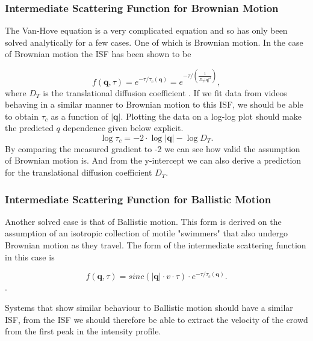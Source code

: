\documentclass[10pt]{article}
\begin{document}
\subsubsection{Intermediate Scattering Function for Brownian Motion}
The Van-Hove equation is a very complicated equation and so has only been solved analytically for a few cases. One of which is Brownian motion. In the case of Brownian motion the ISF has been shown to be

\begin{equation}
\label{eqn:BrownianISF}
	f(\textbf{q}, \tau) = e^{- \tau / \tau_c(\textbf{q})} = e^{- \tau / (\frac{1}{D_T |\textbf{q}|^2})},
\end{equation}
where $D_T$ is the translational diffusion coefficient \cite{ddm1}. If we fit data from videos behaving in a similar manner to Brownian motion to this ISF, we should be able to obtain $\tau_c$ as a function of $|\textbf{q}|$. Plotting the data on a log-log plot should make the predicted $q$ dependence given below explicit.
\begin{equation}
\label{eqn:brownian_diffusion_relation}
\log{\tau_c} = -2 \cdot \log{|\textbf{q}|} - \log{D_T}.
\end{equation}
By comparing the measured gradient to -2 we can see how valid the assumption of Brownian motion is. And from the y-intercept we can also derive a prediction for the translational diffusion coefficient $D_T$.

\subsubsection{Intermediate Scattering Function for Ballistic Motion}
Another solved case is that of Ballistic motion. This form is derived on the assumption of an isotropic collection of motile "swimmers" that also undergo Brownian motion as they travel. The form of the intermediate scattering function in this case is 

\begin{equation}
\label{eqn:BallisticISF}
	f(\textbf{q}, \tau) = sinc(|\textbf{q}| \cdot v \cdot \tau) \cdot e^{- \tau / \tau_c(\textbf{q})}.
\end{equation} \cite{DLSPecora}.

Systems that show similar behaviour to Ballistic motion should have a similar ISF, from the ISF we should therefore be able to extract the velocity of the crowd from the first peak in the intensity profile.
\end{document}
